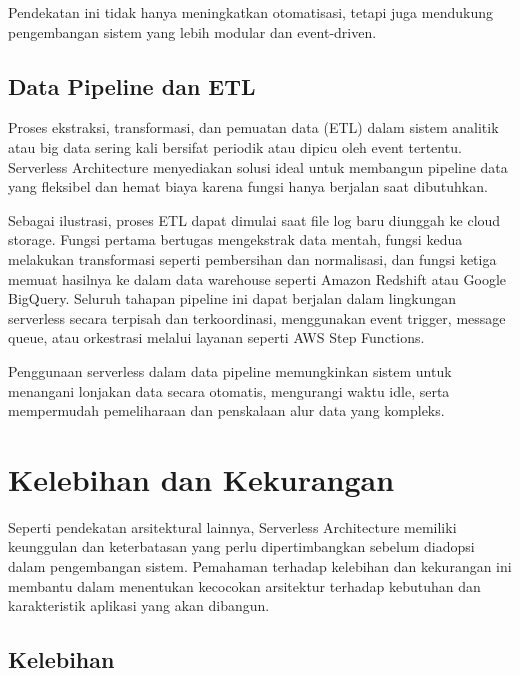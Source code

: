 Pendekatan ini tidak hanya meningkatkan otomatisasi, tetapi juga mendukung pengembangan sistem yang lebih modular dan event-driven.

\subsection{Data Pipeline dan ETL}

Proses ekstraksi, transformasi, dan pemuatan data (ETL) dalam sistem analitik atau big data sering kali bersifat periodik atau dipicu oleh event tertentu. Serverless Architecture menyediakan solusi ideal untuk membangun pipeline data yang fleksibel dan hemat biaya karena fungsi hanya berjalan saat dibutuhkan.

Sebagai ilustrasi, proses ETL dapat dimulai saat file log baru diunggah ke cloud storage. Fungsi pertama bertugas mengekstrak data mentah, fungsi kedua melakukan transformasi seperti pembersihan dan normalisasi, dan fungsi ketiga memuat hasilnya ke dalam data warehouse seperti Amazon Redshift atau Google BigQuery. Seluruh tahapan pipeline ini dapat berjalan dalam lingkungan serverless secara terpisah dan terkoordinasi, menggunakan event trigger, message queue, atau orkestrasi melalui layanan seperti AWS Step Functions.

Penggunaan serverless dalam data pipeline memungkinkan sistem untuk menangani lonjakan data secara otomatis, mengurangi waktu idle, serta mempermudah pemeliharaan dan penskalaan alur data yang kompleks.

\section{Kelebihan dan Kekurangan}

Seperti pendekatan arsitektural lainnya, Serverless Architecture memiliki keunggulan dan keterbatasan yang perlu dipertimbangkan sebelum diadopsi dalam pengembangan sistem. Pemahaman terhadap kelebihan dan kekurangan ini membantu dalam menentukan kecocokan arsitektur terhadap kebutuhan dan karakteristik aplikasi yang akan dibangun.

\subsection{Kelebihan}

